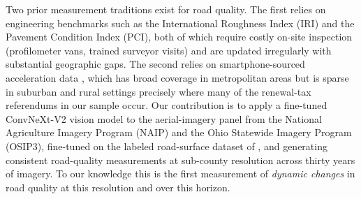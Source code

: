 Two prior measurement traditions exist for road quality. The first relies on engineering benchmarks such as the International Roughness Index (IRI) and the Pavement Condition Index (PCI), both of which require costly on-site inspection (profilometer vans, trained surveyor visits) and are updated irregularly with substantial geographic gaps. The second relies on smartphone-sourced acceleration data \citep{currier2023}, which has broad coverage in metropolitan areas but is sparse in suburban and rural settings precisely where many of the renewal-tax referendums in our sample occur. Our contribution is to apply a fine-tuned ConvNeXt-V2 vision model to the aerial-imagery panel from the National Agriculture Imagery Program (NAIP) and the Ohio Statewide Imagery Program (OSIP3), fine-tuned on the labeled road-surface dataset of \citet{brewer2021}, and generating consistent road-quality measurements at sub-county resolution across thirty years of imagery. To our knowledge this is the first measurement of {\it dynamic changes} in road quality at this resolution and over this horizon.






